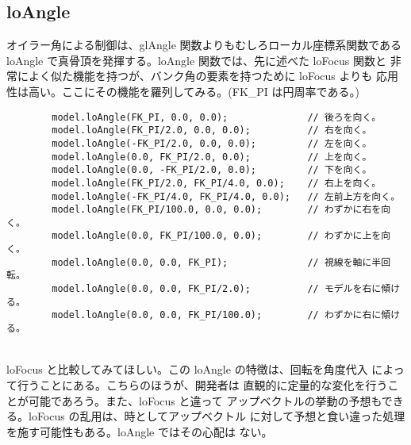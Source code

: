 \subsection{loAngle}
オイラー角による制御は、glAngle 関数よりもむしろローカル座標系関数である
loAngle で真骨頂を発揮する。loAngle 関数では、先に述べた loFocus 関数と
非常によく似た機能を持つが、バンク角の要素を持つために loFocus よりも
応用性は高い。ここにその機能を羅列してみる。(FK\_PI は円周率である。)
\\
\begin{breakbox}
\begin{verbatim}
        model.loAngle(FK_PI, 0.0, 0.0);              // 後ろを向く。
        model.loAngle(FK_PI/2.0, 0.0, 0.0);          // 右を向く。
        model.loAngle(-FK_PI/2.0, 0.0, 0.0);         // 左を向く。
        model.loAngle(0.0, FK_PI/2.0, 0.0);          // 上を向く。
        model.loAngle(0.0, -FK_PI/2.0, 0.0);         // 下を向く。
        model.loAngle(FK_PI/2.0, FK_PI/4.0, 0.0);    // 右上を向く。
        model.loAngle(-FK_PI/4.0, FK_PI/4.0, 0.0);   // 左前上方を向く。
        model.loAngle(FK_PI/100.0, 0.0, 0.0);        // わずかに右を向く。
        model.loAngle(0.0, FK_PI/100.0, 0.0);        // わずかに上を向く。
        model.loAngle(0.0, 0.0, FK_PI);              // 視線を軸に半回転。
        model.loAngle(0.0, 0.0, FK_PI/2.0);          // モデルを右に傾ける。
        model.loAngle(0.0, 0.0, FK_PI/100.0);        // わずかに右に傾ける。
\end{verbatim}
\end{breakbox}
~ \\
loFocus と比較してみてほしい。この loAngle の特徴は、回転を角度代入
によって行うことにある。こちらのほうが、開発者は
直観的に定量的な変化を行うことが可能であろう。また、loFocus と違って
アップベクトルの挙動の予想もできる。loFocus の乱用は、時としてアップベクトル
に対して予想と食い違った処理を施す可能性もある。loAngle ではその心配は
ない。
